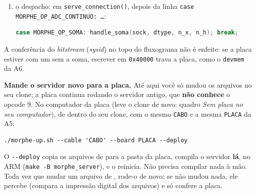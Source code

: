 \documentclass[11pt,a4paper,oneside]{article}
\newcommand{\arq}[1]{{\upshape\ttfamily\detokenize{#1}}}
\begin{document}
\begin{faca}
\begin{enumerate}
\begin{lstlisting}[language=C,basicstyle=\ttfamily\scriptsize]
    char body[512];
    int body_len = snprintf(body, sizeof body,
        "service=morphe\nversion=%u\nhostname=%s\nfft_n=%d\nfft_data_bits=%d\n"
        "fft_frac_bits=%d\nadc_n_max=%d\nadc_fs_max=%d\n"
        "adc_fs_min=%d\nsoma_n_max=%d\nuptime_s=%ld\nfpga_preparada=%d\nfpga_assinatura=%d\n",
        MORPHE_VERSION, g_hostname, MORPHE_FFT_N, MORPHE_FFT_DATA_BITS,
        MORPHE_FFT_FRAC_BITS,
        adc_ok ? MORPHE_ADC_N_MAX : 0,
        MORPHE_ADC_CLK_HZ / MORPHE_ADC_DIV_MIN, MORPHE_ADC_CLK_HZ / MORPHE_ADC_DIV_MAX,
        soma_ok ? MORPHE_SOMA_N_MAX : 0,
        uptime_s, preparada, fpga_tem_assinatura());
\end{lstlisting}
  \item o despacho: em \texttt{serve\_connection()}, depois da linha \texttt{case MORPHE\_OP\_ADC\_CONTINUO: \ldots}:
\begin{lstlisting}[language=C]
        case MORPHE_OP_SOMA: handle_soma(sock, dtype, n_x, n_h); break;
\end{lstlisting}
\end{enumerate}
\end{faca}

\begin{cuidado}
A conferência do \emph{bitstream} (\emph{sysid}) no topo do fluxograma não é
enfeite: se a placa estiver com um \arq{.sof} sem a soma, escrever em
\texttt{0x40000} trava a placa, como o \texttt{devmem} da A6.
\end{cuidado}

\begin{faca}
\textbf{Mande o servidor novo para a placa.} Até aqui você só mudou os
arquivos no seu clone; a placa continua rodando o servidor antigo, que
\textbf{não conhece} o opcode 9. No computador da placa (leve o clone de
novo: quadro \emph{Sem placa no seu computador}), de dentro do seu clone,
com o mesmo \texttt{CABO} e a mesma \texttt{PLACA} da A5:
\begin{lstlisting}[style=sh]
./morphe-up.sh --cable 'CABO' --board PLACA --deploy
\end{lstlisting}
\end{faca}

\begin{porque}
O \texttt{-{}-deploy} copia os arquivos de \arq{C/} para a pasta
\arq{~/morphe} da placa, compila o servidor \textbf{lá}, no ARM
(\texttt{make -B morphe\_server}), e o reinicia. Não precisa compilar nada
à mão. Toda vez que mudar um arquivo de \arq{C/}, rode-o de novo; se não
mudou nada, ele percebe (compara a impressão digital dos arquivos) e só
confere a placa.
\end{porque}
\end{document}
